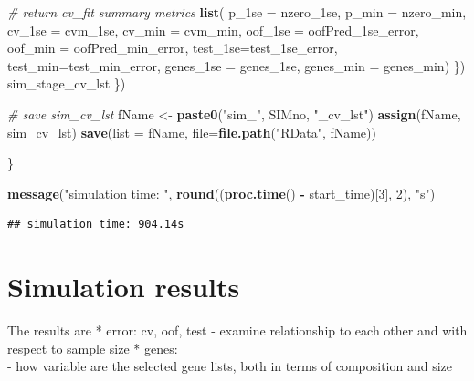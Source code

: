 \documentclass[
]{book}
\newenvironment{Shaded}{\begin{snugshade}}{\end{snugshade}}
\newcommand{\CommentTok}[1]{\textcolor[rgb]{0.56,0.35,0.01}{\textit{#1}}}
\newcommand{\DataTypeTok}[1]{\textcolor[rgb]{0.13,0.29,0.53}{#1}}
\newcommand{\DecValTok}[1]{\textcolor[rgb]{0.00,0.00,0.81}{#1}}
\newcommand{\KeywordTok}[1]{\textcolor[rgb]{0.13,0.29,0.53}{\textbf{#1}}}
\newcommand{\NormalTok}[1]{#1}
\newcommand{\OperatorTok}[1]{\textcolor[rgb]{0.81,0.36,0.00}{\textbf{#1}}}
\newcommand{\StringTok}[1]{\textcolor[rgb]{0.31,0.60,0.02}{#1}}
\begin{document}
\begin{Shaded}
\begin{Highlighting}[]
      \CommentTok{\# return cv\_fit summary metrics}
      \KeywordTok{list}\NormalTok{(}
       \DataTypeTok{p\_1se =}\NormalTok{ nzero\_1se, }
       \DataTypeTok{p\_min =}\NormalTok{ nzero\_min, }
       \DataTypeTok{cv\_1se =}\NormalTok{ cvm\_1se, }
       \DataTypeTok{cv\_min =}\NormalTok{ cvm\_min, }
       \DataTypeTok{oof\_1se =}\NormalTok{ oofPred\_1se\_error, }
       \DataTypeTok{oof\_min =}\NormalTok{ oofPred\_min\_error, }
       \DataTypeTok{test\_1se=}\NormalTok{test\_1se\_error, }
       \DataTypeTok{test\_min=}\NormalTok{test\_min\_error, }
       \DataTypeTok{genes\_1se =}\NormalTok{ genes\_1se,}
       \DataTypeTok{genes\_min =}\NormalTok{ genes\_min)}
\NormalTok{    \})}
\NormalTok{    sim\_stage\_cv\_lst}
\NormalTok{  \})}

  \CommentTok{\# save  sim\_cv\_lst}
\NormalTok{  fName <{-}}\StringTok{ }\KeywordTok{paste0}\NormalTok{(}\StringTok{"sim\_"}\NormalTok{, SIMno, }\StringTok{"\_cv\_lst"}\NormalTok{)}
  \KeywordTok{assign}\NormalTok{(fName, sim\_cv\_lst)}
  \KeywordTok{save}\NormalTok{(}\DataTypeTok{list =}\NormalTok{ fName, }\DataTypeTok{file=}\KeywordTok{file.path}\NormalTok{(}\StringTok{"RData"}\NormalTok{, fName))}

\NormalTok{\}}
\end{Highlighting}
\end{Shaded}

\begin{Shaded}
\begin{Highlighting}[]
  \KeywordTok{message}\NormalTok{(}\StringTok{"simulation time: "}\NormalTok{, }\KeywordTok{round}\NormalTok{((}\KeywordTok{proc.time}\NormalTok{() }\OperatorTok{{-}}\StringTok{ }\NormalTok{start\_time)[}\DecValTok{3}\NormalTok{], }\DecValTok{2}\NormalTok{), }\StringTok{"s"}\NormalTok{)}
\end{Highlighting}
\end{Shaded}

\begin{verbatim}
## simulation time: 904.14s
\end{verbatim}

\hypertarget{simulation-results}{%
\section{Simulation results}\label{simulation-results}}

The results are
* error: cv, oof, test
- examine relationship to each other and with respect to sample size
* genes:\\
- how variable are the selected gene lists, both in terms of composition and size
\end{document}
